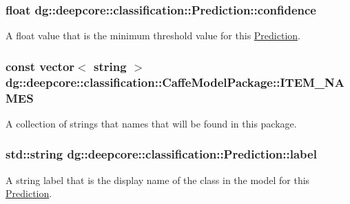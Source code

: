 \subsubsection[{\texorpdfstring{confidence}{confidence}}]{\setlength{\rightskip}{0pt plus 5cm}float dg\+::deepcore\+::classification\+::\+Prediction\+::confidence}\hypertarget{group___classification_module_gae7ab1c3906399dab0ee969ffc521bcfb}{}\label{group___classification_module_gae7ab1c3906399dab0ee969ffc521bcfb}


A float value that is the minimum threshold value for this \hyperlink{structdg_1_1deepcore_1_1classification_1_1_prediction}{Prediction}. 

\subsubsection[{\texorpdfstring{I\+T\+E\+M\+\_\+\+N\+A\+M\+ES}{ITEM_NAMES}}]{\setlength{\rightskip}{0pt plus 5cm}const vector$<$ string $>$ dg\+::deepcore\+::classification\+::\+Caffe\+Model\+Package\+::\+I\+T\+E\+M\+\_\+\+N\+A\+M\+ES\hspace{0.3cm}{\ttfamily [static]}}\hypertarget{group___classification_module_ga44a441d13d149f42cc659ee92e83fdb4}{}\label{group___classification_module_ga44a441d13d149f42cc659ee92e83fdb4}


A collection of strings that names that will be found in this package. 

\subsubsection[{\texorpdfstring{label}{label}}]{\setlength{\rightskip}{0pt plus 5cm}std\+::string dg\+::deepcore\+::classification\+::\+Prediction\+::label}\hypertarget{group___classification_module_gae1374a898e2380401c2e671786e69ff1}{}\label{group___classification_module_gae1374a898e2380401c2e671786e69ff1}


A string label that is the display name of the class in the model for this \hyperlink{structdg_1_1deepcore_1_1classification_1_1_prediction}{Prediction}. 

